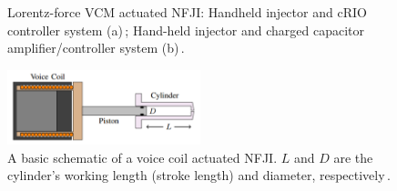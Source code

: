     \begin{figure}[!ht]
        \centering
        \qquad
        \caption[Lorentz-force \acs{VCM} actuated \ac{NFJI}: Handheld injector and cRIO controller system (a)\,\cite{taberner2006}; Hand-held injector and charged capacitor amplifier/controller system (b).]{
            Lorentz-force \acs{VCM} actuated \ac{NFJI}: Handheld injector and cRIO controller system (a)\,\cite{taberner2006}; Hand-held injector and charged capacitor amplifier/controller system (b)\,\cite{ruddy2014}.
        }   \label{fig:chapter/background/vcm injectors}
    \end{figure}
    
    
    \begin{figure}[!ht]
      \centering
      \includegraphics[width=0.5\textwidth]{chap2/images/vcm_for_nfji.png}
      \caption[A basic schematic of a voice coil actuated \acs{NFJI}. $L$ and $D$ are the cylinder’s working length (stroke length) and diameter, respectively.]{A basic schematic of a voice coil actuated \acs{NFJI}. $L$ and $D$ are the cylinder’s working length (stroke length) and diameter, respectively\,\cite{ruddy2014}.}
      \label{fig:chapter/background/vcm for nfji}
    \end{figure}
    
